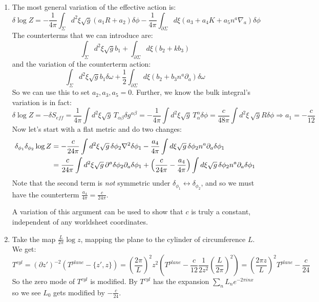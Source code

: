 \documentclass[11pt]{article}
\begin{document}
\begin{enumerate}
	\item The most general variation of the effective action is:
	\begin{equation}
		\delta \log Z = - \frac{1}{4\pi} \int_{\Sigma} d^2 \xi \sqrt{g} (a_1 R + a_2) \delta \phi - \frac{1}{4\pi} \int_{\partial \Sigma} d \xi (a_3 + a_4 K + a_5 n^a \nabla_a) \delta \phi
	\end{equation}
	The counterterms that we can introduce are:
	\begin{equation}
		\int_\Sigma d^2 \xi \sqrt g b_1 + \int_{\partial \Sigma} d \xi (b_2 + k b_3)
	\end{equation}
	and the variation of the counterterm action: 
	\[
		\int_\Sigma d^2 \xi \sqrt g b_1 \delta \omega + \frac12 \int_{\partial \Sigma} d \xi (b_2 + b_3 n^a \partial_a) \delta \omega
	\]
	So we can use this to set $a_2, a_3, a_5 = 0$. Further, we know the bulk integral's variation is in fact:
	\[
		\delta \log Z = - \delta S_{eff} = \frac{1}{4\pi} \int d^2 \xi \sqrt g \, T_{\alpha \beta} \delta g^{\alpha \beta} = - \frac{1}{4\pi} \int d^2 \xi \sqrt g \, T^\alpha_\alpha \delta \phi = \frac{c}{48\pi} \int d^2 \xi \, \sqrt g R \delta \phi \Rightarrow a_1 = - \frac{c}{12}
	\]
	Now let's start with a flat metric and do two changes:
	\[
	\begin{aligned}
		\delta_{\phi_1} \delta_{\phi_2} \log Z &= -\frac{c}{24\pi} \int d^2 \xi \sqrt g\, \delta \phi_2 \nabla^2 \delta \phi_1 - \frac{a_4}{4\pi} \int d\xi \sqrt g\,  \delta \phi_2 n^a \partial_a \delta \phi_1\\ &= \frac{c}{24\pi} \int d^2 \xi \sqrt g\, \partial^a \delta \phi_2 \partial_a \delta \phi_1 + \left(\frac{c}{24\pi} - \frac{a_4}{4\pi}\right) \int d\xi \sqrt g\,  \delta \phi_2 n^a \partial_a \delta \phi_1
	\end{aligned}
	\]
	Note that the second term is \emph{not} symmetric under $\delta_{\phi_1} \leftrightarrow \delta_{\phi_2}$, and so we must have the counterterm $\frac{a_4}{4\pi} = \frac{c}{24\pi}$.
	
	A variation of this argument can be used to show that $c$ is truly a constant, independent of any worldsheet coordinates. 
	
	\item Take the map $\frac{L}{2\pi} \log z$, mapping the plane to the cylinder of circumference $L$. We get:
	\[
		T^{cyl} = (\partial z')^{-2} (T^{plane} - \{z', z\}) = \left( \frac{2\pi}{L}\right)^2 z^2 \left(T^{plane} - \frac{c}{12} \frac{1}{2 z^2} \left(\frac{L}{2\pi} \right)^2 \right) = \left(\frac{2\pi z}{L}\right)^2 T^{plane} - \frac{c}{24}
	\]	
	So the zero mode of $T^{cyl}$ is modified. By $T^{cyl}$ has the expansion $\sum_n L_n e^{-2 \pi i n x}$ so we see $L_0$ gets modified by $-\frac{c}{24}$.
	

\end{enumerate}
\end{document}
